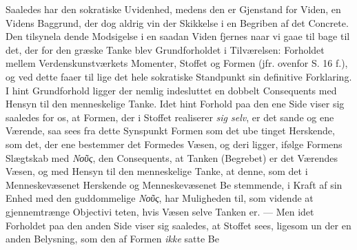 \documentclass[12pt,a4paper]{book}
\newcommand{\gk}[1]{\textit{#1}}
\begin{document}
Saaledes har den sokratiske Uvidenhed, medens den er
Gjenstand for Viden, en Videns Baggrund, der dog aldrig vin\-%
der Skikkelse i en Begriben af det Concrete. Den tilsynela\-%
dende Modsigelse i en saadan Viden fjernes naar vi gaae til\-%
bage til det, der for den græske Tanke blev Grundforholdet i
Tilværelsen: Forholdet mellem Verdenskunstværkets Momenter,
Stoffet og Formen (jfr. ovenfor S. 16 f.), og ved dette faaer til\-%
lige det hele sokratiske Standpunkt sin definitive Forklaring.
I hint Grundforhold ligger der nemlig indesluttet en dobbelt
Consequents med Hensyn til den menneskelige Tanke. Idet
hint Forhold paa den ene Side viser sig saaledes for os, at
Formen, der i Stoffet realiserer \emph{sig selv}, er det sande og ene
Værende, saa sees fra dette Synspunkt Formen som det ube\-%
tinget Herskende, som det, der ene bestemmer det Formedes
Væsen, og deri ligger, ifølge Formens Slægtskab med \gk{Νοῦς},
den Consequents, at Tanken (Begrebet) er det Værendes Væsen,
og med Hensyn til den menneskelige Tanke, at denne, som
det i Menneskevæsenet Herskende og Menneskevæsenet Be\-%
stemmende, i Kraft af sin Enhed med den guddommelige \gk{Νοῦς},
har Muligheden til, som vidende at gjennemtrænge Objectivi\-%
teten, hvis Væsen selve Tanken er. --- Men idet Forholdet paa
den anden Side viser sig saaledes, at Stoffet sees, ligesom un\-%
der en anden Belysning, som den af Formen \emph{ikke} satte Be\-%
\end{document}
